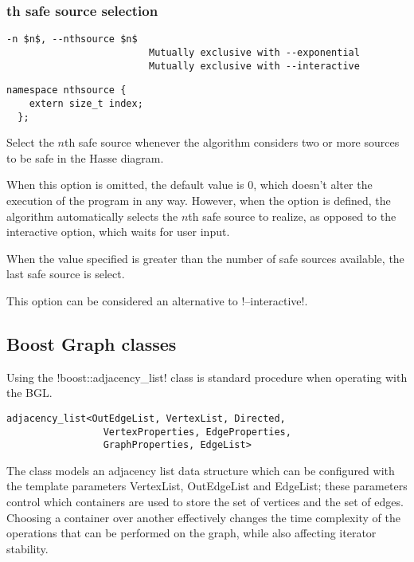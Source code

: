 \subsubsection*{th safe source selection}

\begin{lstlisting}[aboveskip=\smallskipamount]
  -n $n$, --nthsource $n$
                         Mutually exclusive with --exponential
                         Mutually exclusive with --interactive
\end{lstlisting}

\begin{lstlisting}[style=c++_block, aboveskip=\smallskipamount]
  namespace nthsource {
    extern size_t index;
  };
\end{lstlisting}

Select the $n$th safe source whenever the algorithm considers two or more sources to be safe in the Hasse diagram.

When this option is omitted, the default value is 0, which doesn't alter the execution of the program in any way.
However, when the option is defined, the algorithm automatically selects the $n$th safe source to realize, as opposed to the interactive option, which waits for user input.

When the value specified is greater than the number of safe sources available, the last safe source is select.

This option can be considered an alternative to !--interactive!.

\subsection{Boost Graph classes}\label{section:graph-classes}

\lstset{style=c++_block}

Using the !boost::adjacency_list! class is standard procedure when operating with the BGL.

\begin{lstlisting}[style=code_block, basicstyle=\footnotesize\ttfamily\bfseries\color{block_fg}]
  adjacency_list<OutEdgeList, VertexList, Directed,
                 VertexProperties, EdgeProperties,
                 GraphProperties, EdgeList>
\end{lstlisting}

The class models an adjacency list data structure which can be configured with the template parameters VertexList, OutEdgeList and EdgeList; these parameters control which containers are used to store the set of vertices and the set of edges.
Choosing a container over another effectively changes the time complexity of the operations that can be performed on the graph, while also affecting iterator stability.

